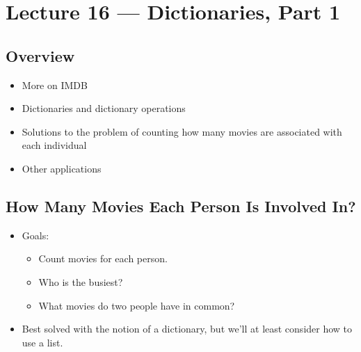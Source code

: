 \documentclass[letterpaper,10pt,english]{sphinxmanual}
\begin{document}
\chapter{Lecture 16 — Dictionaries, Part 1}
\label{\detokenize{lecture_notes/lec16_dictionaries1:lecture-16-dictionaries-part-1}}\label{\detokenize{lecture_notes/lec16_dictionaries1::doc}}

\section{Overview}
\label{\detokenize{lecture_notes/lec16_dictionaries1:overview}}\begin{itemize}
\item {} 
More on IMDB

\item {} 
Dictionaries and dictionary operations

\item {} 
Solutions to the problem of counting how many movies are associated with each individual

\item {} 
Other applications

\end{itemize}


\section{How Many Movies Each Person Is Involved In?}
\label{\detokenize{lecture_notes/lec16_dictionaries1:how-many-movies-each-person-is-involved-in}}\begin{itemize}
\item {} 
Goals:
\begin{itemize}
\item {} 
Count movies for each person.

\item {} 
Who is the busiest?

\item {} 
What movies do two people have in common?

\end{itemize}

\item {} 
Best solved with the notion of a dictionary, but we’ll at least
consider how to use a list.

\end{itemize}
\end{document}
